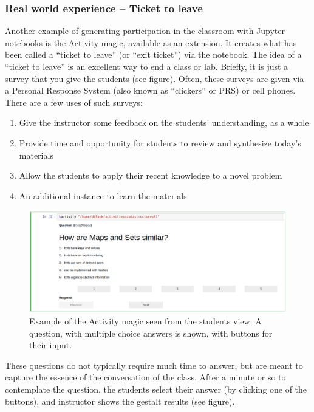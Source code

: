 \documentclass[]{book}
\providecommand{\tightlist}{%
  \setlength{\itemsep}{0pt}\setlength{\parskip}{0pt}}
\begin{document}
\subsubsection{Real world experience -- Ticket to
leave}\label{real-world-experience-ticket-to-leave}

Another example of generating participation in the classroom with
Jupyter notebooks is the Activity magic, available as an extension. It
creates what has been called a ``ticket to leave'' (or ``exit ticket'')
via the notebook. The idea of a ``ticket to leave'' is an excellent way
to end a class or lab. Briefly, it is just a survey that you give the
students (see figure). Often, these surveys are given via a Personal
Response System (also known as ``clickers'' or PRS) or cell phones.
There are a few uses of such surveys:

\begin{enumerate}
\def\labelenumi{\arabic{enumi}.}
\tightlist
\item
  Give the instructor some feedback on the students' understanding, as a
  whole
\item
  Provide time and opportunity for students to review and synthesize
  today's materials
\item
  Allow the students to apply their recent knowledge to a novel problem
\item
  An additional instance to learn the materials
\end{enumerate}

\begin{figure}
\centering
\includegraphics{images/activity-magic-student.png}
\caption{Example of the Activity magic seen from the students view. A
question, with multiple choice answers is shown, with buttons for their
input.}
\end{figure}

These questions do not typically require much time to answer, but are
meant to capture the essence of the conversation of the class. After a
minute or so to contemplate the question, the students select their
answer (by clicking one of the buttons), and instructor shows the
gestalt results (see figure).
\end{document}
